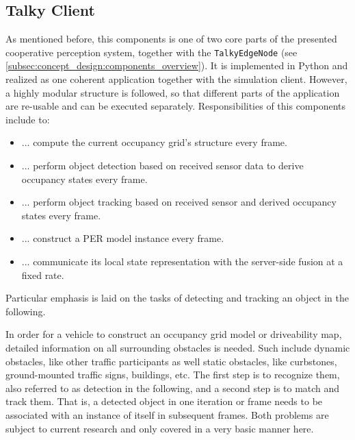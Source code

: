 \subsection{Talky Client}
\label{subsec:implementation:talky_client}
As mentioned before, this components is one of two core parts of the presented cooperative perception system, together with the \texttt{TalkyEdgeNode} (see \cref{subsec:concept_design:components_overview}). It is implemented in Python and realized as one coherent application together with the simulation client. However, a highly modular structure is followed, so that different parts of the application are re-usable and can be executed separately. Responsibilities of this components include to:

\begin{itemize}
	\item ... compute the current occupancy grid's structure every frame.
	\item ... perform object detection based on received sensor data to derive occupancy states every frame.
	\item ... perform object tracking based on received sensor and derived occupancy states every frame.
	\item ... construct a PER model instance every frame.
	\item ... communicate its local state representation with the server-side fusion at a fixed rate.
\end{itemize}

Particular emphasis is laid on the tasks of detecting and tracking an object in the following. 

In order for a vehicle to construct an occupancy grid model or driveability map, detailed information on all surrounding obstacles is needed. Such include dynamic obstacles, like other traffic participants as well static obstacles, like curbstones, ground-mounted traffic signs, buildings, etc. The first step is to recognize them, also referred to as detection in the following, and a second step is to match and track them. That is, a detected object in one iteration or frame needs to be associated with an instance of itself in subsequent frames. Both problems are subject to current research and only covered in a very basic manner here.
\par
\bigskip

